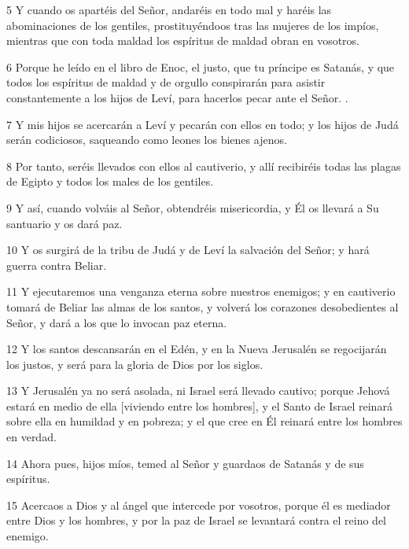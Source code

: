 \par 5 Y cuando os apartéis del Señor, andaréis en todo mal y haréis las abominaciones de los gentiles, prostituyéndoos tras las mujeres de los impíos, mientras que con toda maldad los espíritus de maldad obran en vosotros.

\par 6 Porque he leído en el libro de Enoc, el justo, que tu príncipe es Satanás, y que todos los espíritus de maldad y de orgullo conspirarán para asistir constantemente a los hijos de Leví, para hacerlos pecar ante el Señor. .

\par 7 Y mis hijos se acercarán a Leví y pecarán con ellos en todo; y los hijos de Judá serán codiciosos, saqueando como leones los bienes ajenos.

\par 8 Por tanto, seréis llevados con ellos al cautiverio, y allí recibiréis todas las plagas de Egipto y todos los males de los gentiles.

\par 9 Y así, cuando volváis al Señor, obtendréis misericordia, y Él os llevará a Su santuario y os dará paz.

\par 10 Y os surgirá de la tribu de Judá y de Leví la salvación del Señor; y hará guerra contra Beliar.

\par 11 Y ejecutaremos una venganza eterna sobre nuestros enemigos; y en cautiverio tomará de Beliar las almas de los santos, y volverá los corazones desobedientes al Señor, y dará a los que lo invocan paz eterna.

\par 12 Y los santos descansarán en el Edén, y en la Nueva Jerusalén se regocijarán los justos, y será para la gloria de Dios por los siglos.

\par 13 Y Jerusalén ya no será asolada, ni Israel será llevado cautivo; porque Jehová estará en medio de ella [viviendo entre los hombres], y el Santo de Israel reinará sobre ella en humildad y en pobreza; y el que cree en Él reinará entre los hombres en verdad.

\par 14 Ahora pues, hijos míos, temed al Señor y guardaos de Satanás y de sus espíritus.

\par 15 Acercaos a Dios y al ángel que intercede por vosotros, porque él es mediador entre Dios y los hombres, y por la paz de Israel se levantará contra el reino del enemigo.


